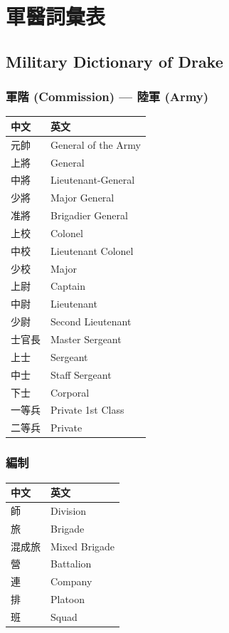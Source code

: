 \documentclass[12pt,a4paper]{article}
\begin{document}
\section{軍醫詞彙表}

\subsection{Military Dictionary of Drake}

\subsubsection{軍階 (Commission) — 陸軍 (Army)}

\begin{longtable}{p{4cm}p{6cm}}
\toprule
\textbf{中文} & \textbf{英文} \\
\midrule
\endhead
元帥 & General of the Army \\
上將 & General \\
中將 & Lieutenant-General \\
少將 & Major General \\
准將 & Brigadier General \\
上校 & Colonel \\
中校 & Lieutenant Colonel \\
少校 & Major \\
上尉 & Captain \\
中尉 & Lieutenant \\
少尉 & Second Lieutenant \\
士官長 & Master Sergeant \\
上士 & Sergeant \\
中士 & Staff Sergeant \\
下士 & Corporal \\
一等兵 & Private 1st Class \\
二等兵 & Private \\
\bottomrule
\end{longtable}

\subsubsection{編制}

\begin{longtable}{p{4cm}p{6cm}}
\toprule
\textbf{中文} & \textbf{英文} \\
\midrule
\endhead
師 & Division \\
旅 & Brigade \\
混成旅 & Mixed Brigade \\
營 & Battalion \\
連 & Company \\
排 & Platoon \\
班 & Squad \\
\bottomrule
\end{longtable}
\end{document}
